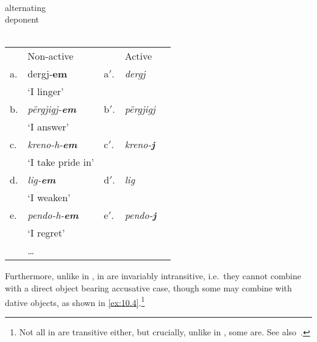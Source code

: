 \documentclass[output=paper]{langsci/langscibook}
\begin{document}
\ea\label{ex:10.2} \\%
         
    \ea alternating  \\
         
    \ex deponent \tab{---} \\
        \tab{} 
    \z
    \ex {}\label{ex:10.3}\\
    \begin{tabular}[t]{@{}lllll@{}}
       & Non-active & & Active & \\
    a. & dergj-\textbf{em} & a$'$. & \llap{*}\emph{dergj} & \\
       & ‘I linger’ & & & \\
    b. & \emph{përgjigj-\textbf{em}} & b$'$. & \llap{*}\emph{përgjigj} & \\
       & ‘I answer’ & & & \\
    c. & \emph{kreno-h-\textbf{em}} & c$'$. & \llap{*}\emph{kreno-\textbf{j}} & \\
       & ‘I take pride in’ & & & \\
    d. & \emph{lig-\textbf{em}} & d$'$. & \llap{*}\emph{lig} & \\
       & ‘I weaken’ & & & \\
    e. & \emph{pendo-h-\textbf{em}} & e$'$. & \llap{*}\emph{pendo-\textbf{j}} & \\
       & ‘I regret’ & & & \\
       & \dots & & & \\
    \end{tabular}
\z

Furthermore, unlike in ,  in  are invariably
intransitive, i.e.\ they cannot combine with a direct object bearing accusative
case, though some may combine with dative objects, as shown in
\eqref{ex:10.4}.\footnote{Not all  in  are transitive either,
but crucially, unlike in , some are. See also~.}

\ea%
    \label{ex:10.4} 
    \z
\z
{}
\end{document}
